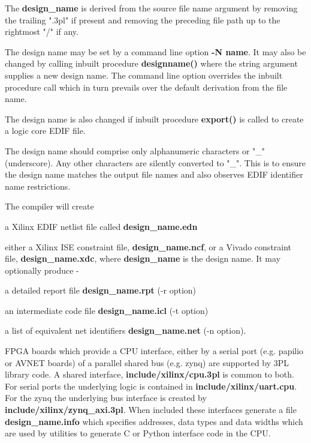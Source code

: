 	The {\bf design\_name} is derived from the source file name argument by
	removing the trailing ".3pl" if present and removing the preceding
	file path up to the rightmost "/" if any.

	The design name may be set by a command line option {\bf -N name}.
	It may also be changed by calling inbuilt procedure
        {\bf designname()} where the string argument supplies a new design name.
        The command line option overrides the inbuilt procedure call which in
        turn prevails over the default derivation from the file name.
        
        The design name is also changed if inbuilt procedure {\bf export()} is
        called to create a logic core EDIF file.
        
	The design name should comprise only alphanumeric characters or "\_"
	(underscore). Any other characters are silently converted to "\_".
	This is to ensure the design name matches the output file names and
	also observes EDIF identifier name restrictions. 

        The compiler will create
        \blist
        \item   a Xilinx EDIF netlist file called {\bf design\_name.edn}
        \item   either a Xilinx ISE constraint file, {\bf design\_name.ncf}, or a Vivado
                constraint file, {\bf design\_name.xdc}, where {\bf design\_name} is the design name.
        \blend
        It may optionally produce - \\
        \blist
        \item   a detailed report file {\bf design\_name.rpt} (-r option) \\
        \item   an intermediate code file {\bf design\_name.icl} (-t option) \\
        \item   a list of equivalent net identifiers {\bf design\_name.net} (-n option).
        \blend
        
        FPGA boards which provide a CPU interface, either by a serial port (e.g.
        papilio or AVNET boards) of a parallel shared bus (e.g. zynq) are supported
        by 3PL library code. A shared interface, {\bf include/xilinx/cpu.3pl} is
        common to both. For serial ports the underlying logic is contained in {\bf
        include/xilinx/uart.cpu}. For the zynq the underlying bus interface is
        created by {\bf include/xilinx/zynq\_axi.3pl}. When included these
        interfaces generate a file {\bf design\_name.info} which specifies addresses, data
        types and data widths which are used by utilities to generate C or Python
        interface code in the CPU.
        
